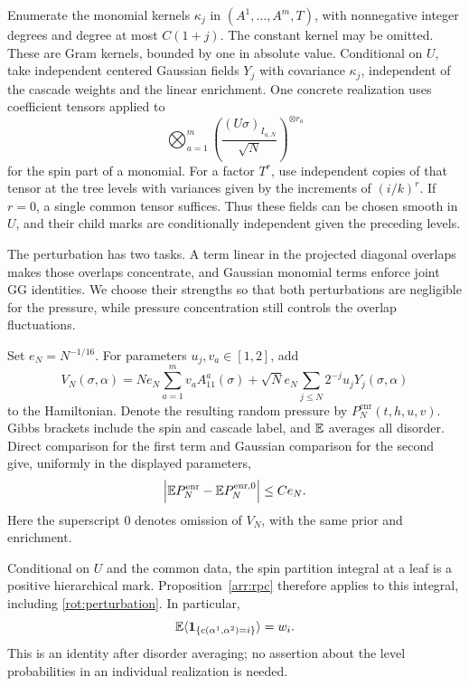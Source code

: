 Enumerate the monomial kernels
\(\kappa_j\) in \((A^1,\ldots,A^m,T)\), with nonnegative integer
degrees and degree at most \(C(1+j)\).  The constant kernel may be
omitted.  These are Gram kernels, bounded by one in absolute value.
Conditional on \(U\), take independent centered Gaussian fields \(Y_j\)
with covariance \(\kappa_j\), independent of the cascade weights and the
linear enrichment.
One concrete realization uses coefficient tensors applied to
\[
 \bigotimes_{a=1}^m
 \left(\frac{(U\sigma)_{I_{a,N}}}{\sqrt N}\right)^{\otimes r_a}
\]
for the spin part of a monomial.  For a factor \(T^r\), use independent
copies of that tensor at the tree levels with variances given by the
increments of \((i/k)^r\).  If \(r=0\), a single common tensor suffices.
Thus these fields can be chosen smooth in \(U\), and their child marks
are conditionally independent given the preceding levels.

The perturbation has two tasks.  A term linear in the projected diagonal
overlaps makes those overlaps concentrate, and Gaussian monomial terms
enforce joint GG identities.  We choose their strengths so that both
perturbations are negligible for the pressure, while pressure
concentration still controls the overlap fluctuations.

Set \(e_N=N^{-1/16}\).  For parameters \(u_j,v_a\in[1,2]\), add
\begin{equation}\label{rot:perturbation}
 V_N(\sigma,\alpha)
   =Ne_N\sum_{a=1}^m v_a A^a_{11}(\sigma)
     +\sqrt N e_N\sum_{j\le N}2^{-j}u_jY_j(\sigma,\alpha)
\end{equation}
to the Hamiltonian.  Denote the resulting random pressure by
\(P_N^{\mathrm{enr}}(t,h,u,v)\).  Gibbs brackets include the spin and
cascade label, and \(\mathbb E\) averages all disorder.
Direct comparison for the first term and Gaussian comparison for the
second give, uniformly in the displayed parameters,
\begin{equation}\label{rot:small-pressure}
 \left|\mathbb E P_N^{\mathrm{enr}}-\mathbb E P_N^{\mathrm{enr},0}\right|
 \le C e_N.
\end{equation}
Here the superscript \(0\) denotes omission of \(V_N\), with the same
prior and enrichment.

Conditional on \(U\) and the common data, the spin partition integral
at a leaf is a positive hierarchical mark.  Proposition~\ref{arr:rpc}
therefore applies to this integral, including
\eqref{rot:perturbation}.  In particular,
\begin{equation}\label{rot:level-law}
 \mathbb E\langle\mathbf 1_{\{c(\alpha^1,\alpha^2)=i\}}\rangle=w_i.
\end{equation}
This is an identity after disorder averaging; no assertion about the
level probabilities in an individual realization is needed.

